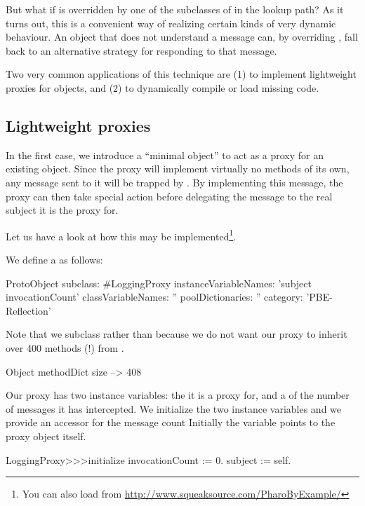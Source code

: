 \documentclass[a4paper,10pt,twoside]{book}
\begin{document}
But what if  is overridden by one of the subclasses of  in the lookup path?
As it turns out, this is a convenient way of realizing certain kinds of very dynamic behaviour. An object that does not understand a message can, by overriding , fall back to an alternative strategy for responding to that message.

Two very common applications of this technique are (1) to implement lightweight proxies for objects, and (2) to dynamically compile or load missing code.

\subsection{Lightweight proxies}

In the first case, we introduce a ``minimal object'' to act as a proxy for an existing object.
Since the proxy will implement virtually no methods of its own, any message sent to it will be trapped by . By implementing this message, the proxy can then take special action before delegating the message to the real subject it is the proxy for.

Let us have a look at how this may be implemented\footnote{You can also load  from \url{http://www.squeaksource.com/PharoByExample/}}.

We define a  as follows:
\begin{code}
ProtoObject subclass: #LoggingProxy
	instanceVariableNames: 'subject invocationCount'
	classVariableNames: ''
	poolDictionaries: ''
	category: 'PBE-Reflection'
\end{code}
Note that we subclass  rather than  because we do not want our proxy to inherit over 400 methods (!) from .

\begin{code}{}
Object methodDict size --> 408
\end{code}

Our proxy has two instance variables: the  it is a proxy for, and a  of the number of messages it has intercepted.
We initialize the two instance variables and we provide an accessor for the message count
Initially the  variable points to the proxy object itself.
\begin{code}{}
LoggingProxy>>>initialize
	invocationCount := 0.
	subject := self.
\end{code}
\end{document}
